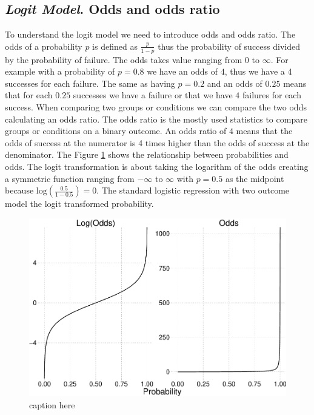 \documentclass[
  man,floatsintext]{apa6}
\begin{document}
\subsection{\texorpdfstring{\emph{Logit Model}. Odds and odds ratio}{Logit Model. Odds and odds ratio}}\label{logit-model.-odds-and-odds-ratio}

To understand the logit model we need to introduce odds and odds ratio. The odds of a probability \(p\) is defined as \(\frac{p}{1 - p}\) thus the probability of success divided by the probability of failure. The odds takes value ranging from 0 to \(\infty\). For example with a probability of \(p = 0.8\) we have an odds of \(4\), thus we have a 4 successes for each failure. The same as having \(p = 0.2\) and an odds of \(0.25\) means that for each \(0.25\) successes we have a failure or that we have \(4\) failures for each success. When comparing two groups or conditions we can compare the two odds calculating an odds ratio. The odds ratio is the mostly used statistics to compare groups or conditions on a binary outcome. An odds ratio of \(4\) means that the odds of success at the numerator is 4 times higher than the odds of success at the denominator. The Figure \ref{fig:fig-odds-example} shows the relationship between probabilities and odds. The logit transformation is about taking the logarithm of the odds creating a symmetric function ranging from \(-\infty\) to \(\infty\) with \(p = 0.5\) as the midpoint because \(\text{log}(\frac{0.5}{1 - 0.5}) = 0\). The standard logistic regression with two outcome model the logit transformed probability.

\scriptsize

\begin{figure}

{\centering \includegraphics{paper_files/figure-latex/fig-odds-example-1} 

}

\caption{caption here}\label{fig:fig-odds-example}
\end{figure}
\end{document}
